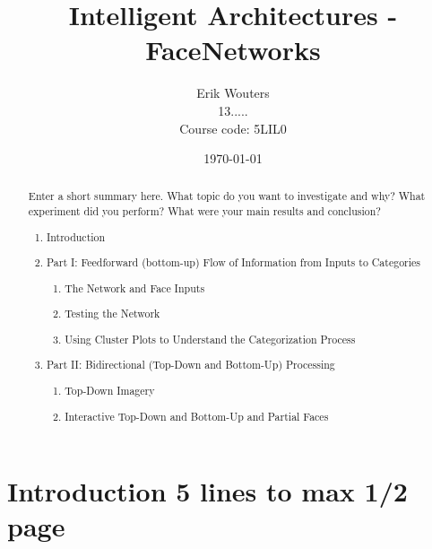 \documentclass[a4paper]{article}
\title{Intelligent Architectures - FaceNetworks}
\author{Erik Wouters \\
13..... \\
Course code: 5LIL0}
\date{\today}
\begin{document}
\maketitle

\begin{abstract}
Enter a short summary here. What topic do you want to investigate and why? What experiment did you perform? What were your main results and conclusion?


\begin{enumerate}
    \item Introduction
    \item Part I: Feedforward (bottom-up) Flow of     Information from Inputs to Categories
    \begin{enumerate}
        \item The Network and Face Inputs
        \item Testing the Network
        \item Using Cluster Plots to Understand the Categorization Process
    \end{enumerate}
    \item Part II: Bidirectional (Top-Down and Bottom-Up)     Processing
    \begin{enumerate}
        \item Top-Down Imagery
        \item Interactive Top-Down and Bottom-Up and Partial     Faces
    \end{enumerate}
\end{enumerate}

\end{abstract}

\section{Introduction 5 lines to max 1/2 page}
\label{sec:introduction}



\end{document}
